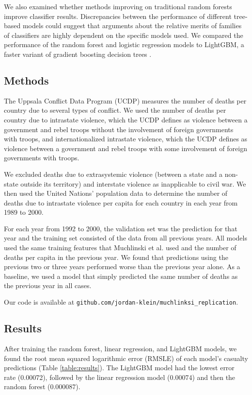 \documentclass{article}
\begin{document}
We also examined whether methods improving on traditional random forests improve classifier results. Discrepancies between the performance of different tree-based models could suggest that arguments about the relative merits of families of classifiers are highly dependent on the specific models used. We compared the performance of the random forest and logistic regression models to LightGBM, a faster variant of gradient boosting decision trees \citep{ke2017lightgbm}.



\subsection*{Methods}
The Uppsala Conflict Data Program (UCDP) measures the number of deaths per country due to several types of conflict. We used the number of deaths per country due to intrastate violence, which the UCDP defines as violence between a government and rebel troops without the involvement of foreign governments with troops, and internationalized intrastate violence, which the UCDP defines as violence between a government and rebel troops with some involvement of foreign governments with troops.

We excluded deaths due to extrasystemic violence (between a state and a non-state outside its territory) and interstate violence as inapplicable to civil war. We then used the United Nations' population data to determine the number of deaths due to intrastate violence per capita for each country in each year from 1989 to 2000.

For each year from 1992 to 2000, the validation set was the prediction for that year and the training set consisted of the data from all previous years. All models used the same training features that Muchlinski et al. used and the number of deaths per capita in the previous year. We found that predictions using the previous two or three years performed worse than the previous year alone. As a baseline, we used a model that simply predicted the same number of deaths as the previous year in all cases.

Our code is available at \texttt{github.com/jordan-klein/muchlinksi\_replication}.

\subsection*{Results}
After training the random forest, linear regression, and LightGBM models, we found the root mean squared logarithmic error (RMSLE) of each model's casualty predictions (Table \ref{table:results}). The LightGBM model had the lowest error rate (0.00072), followed by the linear regression model (0.00074) and then the random forest (0.000087).
\end{document}
